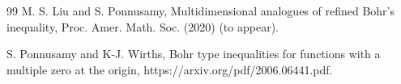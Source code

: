 \documentclass[a4paper,12pt]{amsart}
\theoremstyle{plain}
\theoremstyle{definition}
\begin{document}
\begin{thebibliography}{99}
	 {\sc M. S. Liu} and {\sc S. Ponnusamy}, Multidimensional analogues of refined Bohr's inequality, Proc. Amer. Math. Soc. (2020) (to appear).
	
	
	
	
	
	
	
	
	 {\sc S. Ponnusamy} and {\sc K-J. Wirths}, Bohr type inequalities for functions with a multiple zero at the origin, https://arxiv.org/pdf/2006.06441.pdf.	
	

\end{thebibliography}
\end{document}
